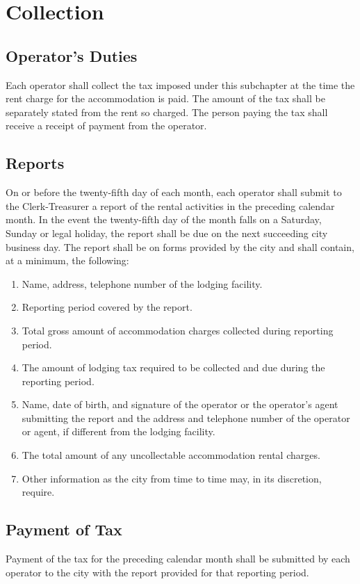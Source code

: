 \section{Collection}
\subsection{Operator's Duties}
Each operator shall collect the tax imposed under this subchapter at the time the rent charge for the accommodation is paid. The amount of the tax shall be separately stated from the rent so charged. The person paying the tax shall receive a receipt of payment from the operator.
\subsection{Reports}
On or before the twenty-fifth day of each month, each operator shall submit to the Clerk-Treasurer a report of the rental activities in the preceding calendar month. In the event the twenty-fifth day of the month falls on a Saturday, Sunday or legal holiday, the report shall be due on the next succeeding city business day. The report shall be on forms provided by the city and shall contain, at a minimum, the following:
\begin{enumerate}
\item Name, address, telephone number of the lodging facility.
\item Reporting period covered by the report.
\item Total gross amount of accommodation charges collected during reporting period.
\item The amount of lodging tax required to be collected and due during the reporting period.
\item Name, date of birth, and signature of the operator or the operator’s agent submitting the report and the address and telephone number of the operator or agent, if different from the lodging facility.
\item The total amount of any uncollectable accommodation rental charges.
\item Other information as the city from time to time may, in its discretion, require.
\end{enumerate}
\subsection{Payment of Tax}
Payment of the tax for the preceding calendar month shall be submitted by each operator to the city with the report provided for that reporting period.
